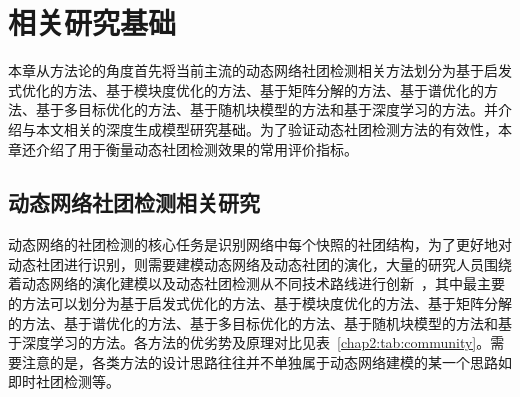 \baselineskip 20pt

\chapter{相关研究基础}
\label{chap:2}
本章从方法论的角度首先将当前主流的动态网络社团检测相关方法划分为基于启发式优化的方法、基于模块度优化的方法、基于矩阵分解的方法、基于谱优化的方法、基于多目标优化的方法、基于随机块模型的方法和基于深度学习的方法。并介绍与本文相关的深度生成模型研究基础。为了验证动态社团检测方法的有效性，本章还介绍了用于衡量动态社团检测效果的常用评价指标。

\section{动态网络社团检测相关研究}
动态网络的社团检测的核心任务是识别网络中每个快照的社团结构，为了更好地对动态社团进行识别，则需要建模动态网络及动态社团的演化，大量的研究人员围绕着动态网络的演化建模以及动态社团检测从不同技术路线进行创新~\cite{JSJA2023S2059}，其中最主要的方法可以划分为基于启发式优化的方法、基于模块度优化的方法、基于矩阵分解的方法、基于谱优化的方法、基于多目标优化的方法、基于随机块模型的方法和基于深度学习的方法。各方法的优劣势及原理对比见表~\ref{chap2:tab:community}。需要注意的是，各类方法的设计思路往往并不单独属于动态网络建模的某一个思路如即时社团检测等。
